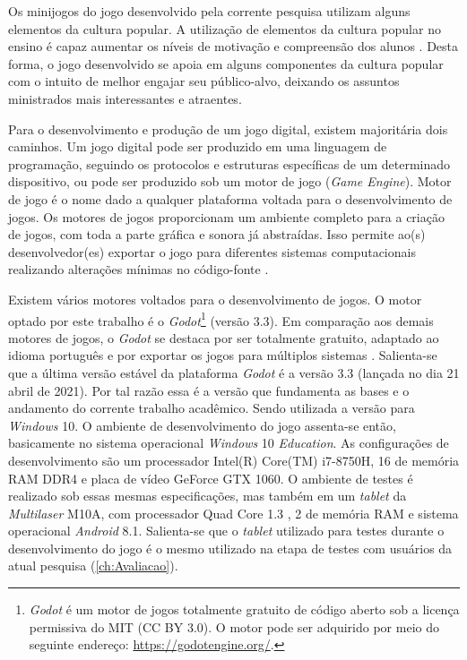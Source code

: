 Os minijogos do jogo desenvolvido pela corrente pesquisa utilizam alguns elementos da cultura popular. A utilização de elementos da cultura popular no ensino é capaz aumentar os níveis de motivação e compreensão dos alunos \cite{giroux1988schooling, cheung2001use, duncan2004your, chik2011learner}. Desta forma, o jogo desenvolvido se apoia em alguns componentes da cultura popular com o intuito de melhor engajar seu público-alvo, deixando os assuntos ministrados mais interessantes e atraentes. 

Para o desenvolvimento e produção de um jogo digital, existem majoritária dois caminhos. Um jogo digital pode ser produzido em uma linguagem de programação, seguindo os protocolos e estruturas específicas de um determinado dispositivo, ou pode ser produzido sob um motor de jogo (\textit{Game Engine}). Motor de jogo é o nome dado a qualquer plataforma voltada para o desenvolvimento de jogos. Os motores de jogos proporcionam um ambiente completo para a criação de jogos, com toda a parte gráfica e sonora já abstraídas. Isso permite ao(s) desenvolvedor(es) exportar o jogo para diferentes sistemas computacionais realizando alterações mínimas no código-fonte \cite{bishop1998designing, machado2009serious}.

Existem vários motores voltados para o desenvolvimento de jogos. O motor optado por este trabalho é o \textit{Godot}\footnote{\textit{Godot} é um motor de jogos totalmente gratuito de código aberto sob a licença permissiva do MIT (CC BY 3.0). O motor pode ser adquirido por meio do seguinte endereço: \url{https://godotengine.org/}.} (versão 3.3). Em comparação aos demais motores de jogos, o \textit{Godot} se destaca por ser totalmente gratuito, adaptado ao idioma português e por exportar os jogos para múltiplos sistemas \cite{scherer2020analise}. Salienta-se que a última versão estável da plataforma \textit{Godot} é a versão 3.3 (lançada no dia 21 abril de 2021). Por tal razão essa é a versão que fundamenta as bases e o andamento do corrente trabalho acadêmico. Sendo utilizada a versão para \textit{Windows} 10. O ambiente de desenvolvimento do jogo assenta-se então, basicamente no sistema operacional \textit{Windows} 10 \textit{Education}. As configurações de desenvolvimento são um processador Intel(R) Core(TM) i7-8750H, 16  de memória RAM DDR4 e placa de vídeo GeForce GTX 1060. O ambiente de testes é realizado sob essas mesmas especificações, mas também em um \textit{tablet} da \textit{Multilaser} M10A, com processador Quad Core 1.3 , 2  de memória RAM e sistema operacional \textit{Android} 8.1. Salienta-se que o \textit{tablet} utilizado para testes durante o desenvolvimento do jogo é o mesmo utilizado na etapa de testes com usuários da atual pesquisa (\autoref{ch:Avaliacao}).

